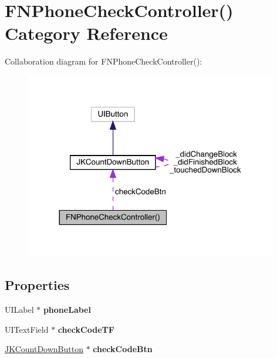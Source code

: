 \hypertarget{category_f_n_phone_check_controller_07_08}{}\section{F\+N\+Phone\+Check\+Controller() Category Reference}
\label{category_f_n_phone_check_controller_07_08}


Collaboration diagram for F\+N\+Phone\+Check\+Controller()\+:\nopagebreak
\begin{figure}[H]
\begin{center}
\leavevmode
\includegraphics[width=312pt]{category_f_n_phone_check_controller_07_08__coll__graph}
\end{center}
\end{figure}
\subsection*{Properties}
\begin{DoxyCompactItemize}
\item 
\mbox{\label{category_f_n_phone_check_controller_07_08_a19b087f36703f5731083c21938abe741}} 
U\+I\+Label $\ast$ {\bfseries phone\+Label}
\item 
\mbox{\label{category_f_n_phone_check_controller_07_08_ad020ea7352b019f5b1c46fe0e0e364d3}} 
U\+I\+Text\+Field $\ast$ {\bfseries check\+Code\+TF}
\item 
\mbox{\label{category_f_n_phone_check_controller_07_08_aa4b436a3b4c6f68f92ffea068cba1412}} 
\mbox{\hyperlink{interface_j_k_count_down_button}{J\+K\+Count\+Down\+Button}} $\ast$ {\bfseries check\+Code\+Btn}
\end{DoxyCompactItemize}



